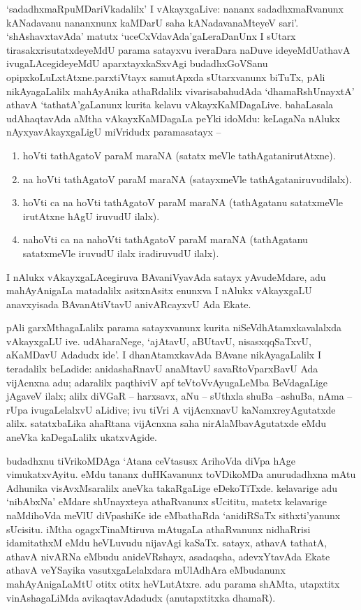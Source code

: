 `sadadhxmaRpuMDariVkadalilx' I vAkayxgaLive: nananx sadadhxmaRvanunx kANadavanu nananxnunx kaMDarU saha kANadavanaMteyeV sari'. `shAshavxtavAda' matutx `uceCxVdavAda'gaLera\-DanUnx I sUtarx tirasakxrisutatxdeyeMdU parama satayxvu iveraDara naDuve ideyeMdU\break athavA ivugaLAcegideyeMdU aparxtayxkaSxvAgi budadhxGoVSanu opipxkoLuLxtAtxne.\break parxtiVtayx samutApxda sUtarxvanunx biTuTx, pAli nikAyagaLalilx mahAyAnika athaRdalilx vivarisabahudAda `dhamaRshUnayxtA' athavA `tathatA'gaLanunx kurita kelavu vAkayxKaMDa\-gaLive. bahaLasala udAhaqtavAda aMtha vAkayxKaMDagaLa peYki idoMdu: keLagaNa nAlukx nAyxyavAkayxgaLigU miVridudx paramasatayx --
\begin{enumerate}
\renewcommand{\theenumi}{\arabic{enumi}}
\renewcommand{\labelenumi}{(\theenumi)}
\item hoVti tathAgatoV paraM maraNA (satatx meVle tathAgatanirutAtxne).
\item na hoVti tathAgatoV paraM maraNA (satayxmeVle tathAgataniruvudilalx).
\item hoVti ca na hoVti tathAgatoV paraM maraNA (tathAgatanu satatxmeVle irutAtxne hAgU iruvudU ilalx).
\item nahoVti ca na nahoVti tathAgatoV paraM maraNA (tathAgatanu satatxmeVle iruvudU ilalx iradiruvudU ilalx).
\end{enumerate}

I nAlukx vAkayxgaLAcegiruva BAvaniVyavAda satayx yAvudeMdare, adu mahAyAnigaLa matadalilx asitxnAsitx enunxva I nAlukx vAkayxgaLU anavxyisada BAvanAtiVtavU anivARcayxvU Ada Ekate.

pAli garxMthagaLalilx parama satayxvanunx kurita niSeVdhAtamxkavalalxda vAkayxgaLU ive. udAharaNege, `ajAtavU, aBUtavU, nisasxqqSaTxvU, aKaMDavU Adadudx ide'. I dhanAtamxkavAda BAvane nikAyagaLalilx I teradalilx beLadide: anidashaRnavU anaMtavU savaRtoVparxBavU Ada vijAcnxna adu; adaralilx paqthiviV apf teVtoVvAyugaLeMba BeVdagaLige jAgaveV ilalx; alilx diVGaR -- harxsavx, aNu -- sUthxla shuBa --ashuBa, nAma -- rUpa ivugaLelalxvU aLidive; ivu tiVri A vijAcnxnavU kaNamxreyAgutatxde alilx. satatxbaLika ahaRtana vijAcnxna saha nirAlaMbavAgutatxde eMdu aneVka kaDegaLalilx ukatxvAgide.

budadhxnu tiVrikoMDAga `Atana ceVtasusx ArihoVda diVpa hAge vimukatx\-vAyitu. eMdu tananx duHKavanunx toVDikoMDa anurudadhxna mAtu Adhunika visAvxMsaralilx aneVka takaRgaLige eDekoTiTxde. kelavarige adu `nibAbxNa' eMdare shUnayxteya athaRvanunx sUcititu, matetx kelavarige naMdihoVda meVlU diVpashiKe ide eMbathaRda `anidiRSaTx sithxti'yanunx sUcisitu. iMtha ogagxTinaMtiruva mAtugaLa athaRvanunx nidhaRrisi idamitathxM eMdu heVLuvudu nijavAgi kaSaTx. satayx, athavA tathatA, athavA nivARNa eMbudu anideVRshayx, asadaqsha, adevxYtavAda Ekate athavA veYSayika vasutxgaLelalxdara mUlAdhAra eMbudanunx mahAyAnigaLaMtU otitx otitx heVLutAtxre. adu parama shAMta, utapxtitx vinAshagaLiMda avikaqtavAdadudx (anutapxtitxka dhamaR).

